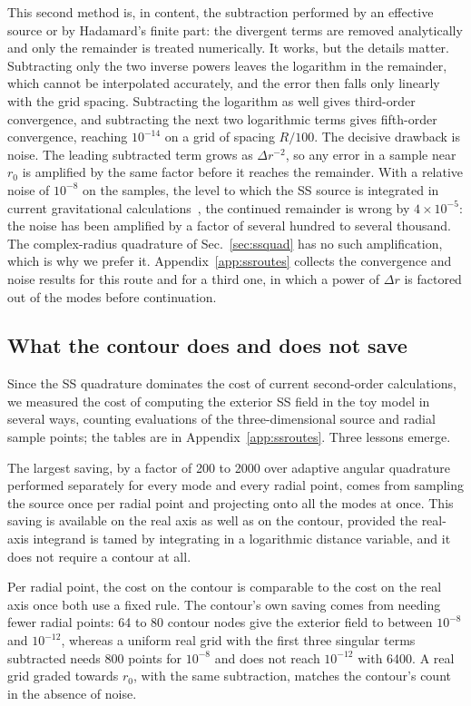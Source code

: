 \documentclass[aps,prd,twocolumn,superscriptaddress,nofootinbib,floatfix]{revtex4-2}
\begin{document}
This second method is, in content, the subtraction performed by an effective source or by Hadamard's finite part: the divergent terms are removed analytically and only the remainder is treated numerically.
It works, but the details matter.
Subtracting only the two inverse powers leaves the logarithm in the remainder, which cannot be interpolated accurately, and the error then falls only linearly with the grid spacing.
Subtracting the logarithm as well gives third-order convergence, and subtracting the next two logarithmic terms gives fifth-order convergence, reaching $10^{-14}$ on a grid of spacing $R/100$.
The decisive drawback is noise.
The leading subtracted term grows as $\Delta r^{-2}$, so any error in a sample near $r_0$ is amplified by the same factor before it reaches the remainder.
With a relative noise of $10^{-8}$ on the samples, the level to which the SS source is integrated in current gravitational calculations~\cite{Upton2026}, the continued remainder is wrong by $4\times10^{-5}$: the noise has been amplified by a factor of several hundred to several thousand.
The complex-radius quadrature of Sec.~\ref{sec:ssquad} has no such amplification, which is why we prefer it.
Appendix~\ref{app:ssroutes} collects the convergence and noise results for this route and for a third one, in which a power of $\Delta r$ is factored out of the modes before continuation.

\subsection{What the contour does and does not save}\label{sec:cost}

Since the SS quadrature dominates the cost of current second-order calculations, we measured the cost of computing the exterior SS field in the toy model in several ways, counting evaluations of the three-dimensional source and radial sample points; the tables are in Appendix~\ref{app:ssroutes}.
Three lessons emerge.

The largest saving, by a factor of 200 to 2000 over adaptive angular quadrature performed separately for every mode and every radial point, comes from sampling the source once per radial point and projecting onto all the modes at once.
This saving is available on the real axis as well as on the contour, provided the real-axis integrand is tamed by integrating in a logarithmic distance variable, and it does not require a contour at all.

Per radial point, the cost on the contour is comparable to the cost on the real axis once both use a fixed rule.
The contour's own saving comes from needing fewer radial points: 64 to 80 contour nodes give the exterior field to between $10^{-8}$ and $10^{-12}$, whereas a uniform real grid with the first three singular terms subtracted needs 800 points for $10^{-8}$ and does not reach $10^{-12}$ with 6400.
A real grid graded towards $r_0$, with the same subtraction, matches the contour's count in the absence of noise.
\end{document}

